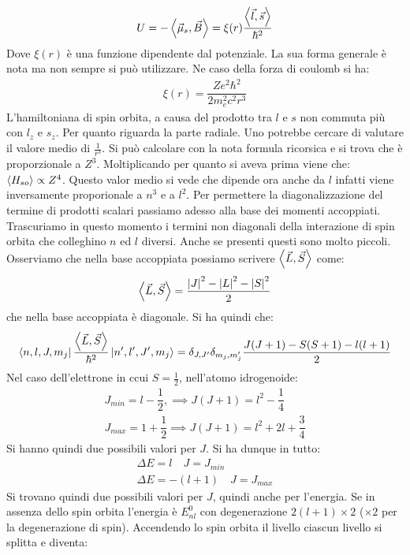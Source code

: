 \documentclass[../AppuntiStruttura]{subfiles}
\begin{document}
	\begin{gather*}
		U=-\left<\vec{\mu}_{s},\vec{B}\right>=\xi(r)\dfrac{\left<\vec{l},\vec{s}\right>}{\hbar^{2}}
	\end{gather*}
	Dove $ \xi(r) $ è una funzione dipendente dal potenziale. La sua forma generale è nota ma non sempre si può utilizzare. Ne caso della forza di coulomb si ha:
	\begin{gather*}
		\xi(r)=\dfrac{Ze^{2}\hbar^{2}}{2m_{e}^{2}c^{2}r^{3}}
	\end{gather*}
	L'hamiltoniana di spin orbita, a causa del prodotto tra $ l $ e $ s $ non commuta più con $ l_{z} $ e $ s_{z} $. Per quanto riguarda la parte radiale. Uno potrebbe cercare di valutare il valore medio di $ \frac{1}{r^{3}} $. Si può calcolare con la nota formula ricorsica e si trova che è proporzionale a $ Z^3 $. Moltiplicando per quanto si aveva prima viene che: $ \expval{H_{so}}\propto Z^4 $. Questo valor medio si vede che dipende ora anche da $ l $ infatti viene inversamente proporionale a $ n^3 $ e a $ l^{2} $. Per permettere la diagonalizzazione del termine di prodotti scalari passiamo adesso alla base dei momenti accoppiati. Trascuriamo in questo momento i termini non diagonali della interazione di spin orbita che colleghino $ n $ ed $ l $ diversi. Anche se presenti questi sono molto piccoli. Osserviamo che nella base accoppiata possiamo scrivere $ \left<\vec{L},\vec{S}\right> $ come:
	\begin{gather*}
		\left<\vec{L},\vec{S}\right>=\dfrac{\left|J\right|^{2}-\left|L\right|^{2}-\left|S\right|^{2}}{2}
	\end{gather*}
	che nella base accoppiata è diagonale. Si ha quindi che:
	\begin{gather*}
	\bra{n,l,J,m_{j}}\dfrac{\left<\vec{L},\vec{S}\right>}{\hbar^{2}}\ket{n',l',J',m_{j}}=\delta_{J,J'}\delta_{m_{j},m_{j}'}\dfrac{J(J+1)-S(S+1)-l(l+1)}{2}
	\end{gather*}
	Nel caso dell'elettrone in ccui $ S=\frac{1}{2} $, nell'atomo idrogenoide:
	\begin{gather*}
	J_{min}=l-\dfrac{1}{2},\implies J(J+1)=l^{2}-\dfrac{1}{4} \\ J_{max}=1+\dfrac{1}{2}\implies J(J+1)=l^{2}+2l+\dfrac{3}{4}
	\end{gather*}
	Si hanno quindi due possibili valori per $ J $. Si ha dunque in tutto:
	\begin{gather*}
	\Delta E = l \quad J=J_{min} \\
	\Delta E = -(l+1) \quad J=J_{max}
	\end{gather*}
	Si trovano quindi due possibili valori per $ J $, quindi anche per l'energia. Se in assenza dello spin orbita l'energia è $ E^{0}_{nl} $ con degenerazione $ 2(l+1)\times 2 $ ($ \times 2 $ per la degenerazione di spin). Accendendo lo spin orbita il livello ciascun livello si splitta e diventa:
\end{document}
